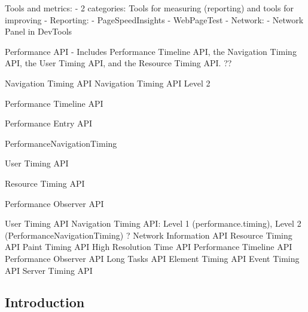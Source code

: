 Tools and metrics:
- 2 categories: Tools for measuring (reporting) and tools for improving
- Reporting:
- PageSpeedInsights
- WebPageTest
- Network:
- Network Panel in DevTools





Performance API %
- Includes Performance Timeline API, the Navigation Timing API, the User Timing API, and the Resource Timing API.  ??



Navigation Timing API %
Navigation Timing API Level 2 %

Performance Timeline API %

Performance Entry API %

PerformanceNavigationTiming %



User Timing API %

Resource Timing API %



Performance Observer API %




User Timing API
Navigation Timing API: Level 1 (performance.timing), Level 2 (PerformanceNavigationTiming) ?
Network Information API
Resource Timing API
Paint Timing API
High Resolution Time API
Performance Timeline API
Performance Observer API
Long Tasks API
Element Timing API
Event Timing API
Server Timing API
















\subsection{Introduction}

